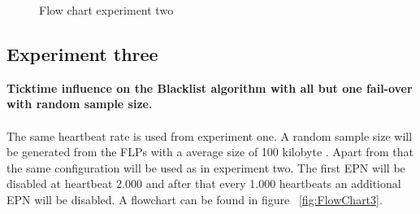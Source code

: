 \begin{figure}[htb]
    \caption{Flow chart experiment two}
    \label{fig:FlowChart2}
\end{figure}

\subsection{Experiment three}
\textbf{Ticktime influence on the Blacklist algorithm with all but one fail-over with random sample size.}
\\~\\
The same heartbeat rate is used from experiment one. A random sample size will be generated from the FLPs with a average size of 100 kilobyte . Apart from that the same configuration will be used as in experiment two. The first EPN will be disabled at heartbeat 2.000 and after that every 1.000 heartbeats an additional EPN will be disabled. A flowchart can be found in figure ~\ref{fig:FlowChart3}.

